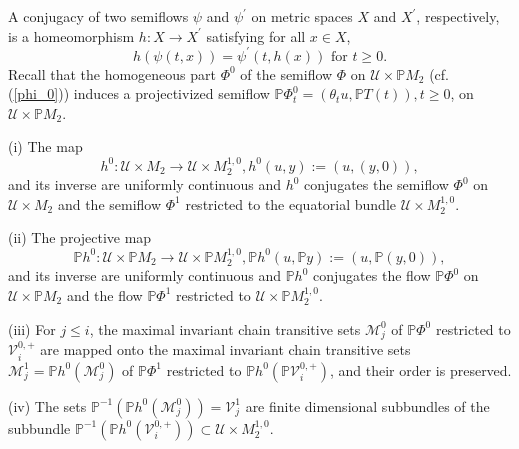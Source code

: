 \documentclass{siamltex}%
\begin{document}
A conjugacy of two semiflows $\psi$ and $\psi^{\prime}$ on metric spaces $X$
and $X^{\prime}$, respectively, is a homeomorphism $h:X\rightarrow X^{\prime}$
satisfying for all $x\in X$,%
\[
h(\psi(t,x))=\psi^{\prime}(t,h(x))\text{ for }t\geq0.
\]
Recall that the homogeneous part $\Phi^{0}$ of the semiflow $\Phi$ on
$\mathcal{U}\times\mathbb{P}M_{2}$ (cf. (\ref{phi_0})) induces a projectivized
semiflow $\mathbb{P}\Phi_{t}^{0}=(\theta_{t}u,\mathbb{P}T(t)),t\geq0$, on
$\mathcal{U}\times\mathbb{P}M_{2}$.

\begin{proposition}
\label{Proposition_e1}(i) The map%
\[
h^{0}:\mathcal{U}\times M_{2}\rightarrow\mathcal{U}\times M_{2}^{1,0}%
,h^{0}(u,y):=(u,(y,0)),
\]
and its inverse are uniformly continuous and $h^{0}$ conjugates the semiflow
$\Phi^{0}$ on $\mathcal{U}\times M_{2}$ and the semiflow $\Phi^{1}$ restricted
to the equatorial bundle $\mathcal{U}\times M_{2}^{1,0}$.

(ii) The projective map%
\[
\mathbb{P}h^{0}:\mathcal{U}\times\mathbb{P}M_{2}\rightarrow\mathcal{U}%
\times\mathbb{P}M_{2}^{1,0},\mathbb{P}h^{0}(u,\mathbb{P}y):=(u,\mathbb{P}%
(y,0)),
\]
and its inverse are uniformly continuous and $\mathbb{P}h^{0}$ conjugates the
flow $\mathbb{P}\Phi^{0}$ on $\mathcal{U}\times\mathbb{P}M_{2}$ and the flow
$\mathbb{P}\Phi^{1}$ restricted to $\mathcal{U}\times\mathbb{P}M_{2}^{1,0}$.

(iii) For $j\leq i$, the maximal invariant chain transitive sets
$\mathcal{M}_{j}^{0}$ of $\mathbb{P}\Phi^{0}$ restricted to $\mathcal{V}%
_{i}^{0,+}$ are mapped onto the maximal invariant chain transitive sets
$\mathcal{M}_{j}^{1}=\mathbb{P}h^{0}(\mathcal{M}_{j}^{0})$ of $\mathbb{P}%
\Phi^{1}$ restricted to $\mathbb{P}h^{0}(\mathbb{P}\mathcal{V}_{i}^{0,+})$,
and their order is preserved.

(iv) The sets $\mathbb{P}^{-1}(\mathbb{P}h^{0}(\mathcal{M}_{j}^{0}%
))=\mathcal{V}_{j}^{1}$ are finite dimensional subbundles of the subbundle
$\mathbb{P}^{-1}\left(  \mathbb{P}h^{0}(\mathcal{V}_{i}^{0,+})\right)
\subset\mathcal{U}\times M_{2}^{1,0}$.
\end{proposition}
\end{document}
